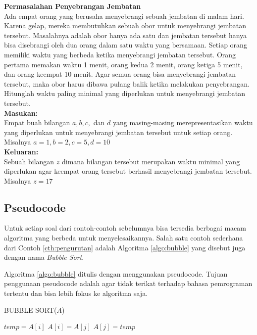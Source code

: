 \begin{contoh}
\textbf{Permasalahan Penyebrangan Jembatan}\\
Ada empat orang yang berusaha menyebrangi sebuah jembatan di malam hari. Karena gelap, mereka membutuhkan sebuah obor untuk menyebrangi jembatan tersebut. Masalahnya adalah obor hanya ada satu dan jembatan tersebut hanya bisa disebrangi oleh dua orang dalam satu waktu yang bersamaan. Setiap orang memiliki waktu yang berbeda ketika menyebrangi jembatan tersebut. Orang pertama memakan waktu 1 menit, orang kedua 2 menit, orang ketiga 5 menit, dan orang keempat 10 menit. 
Agar semua orang bisa menyebrangi jembatan tersebut, maka obor harus dibawa pulang balik ketika melakukan penyebrangan. Hitunglah waktu paling minimal yang diperlukan untuk menyebrangi jembatan tersebut.\\
\textbf{Masukan:}\\
Empat buah bilangan $a,b,c,$ dan $d$ yang masing-masing merepresentasikan waktu yang diperlukan untuk menyebrangi jembatan tersebut untuk setiap orang.\\
Misalnya $a = 1, b = 2, c = 5, d = 10$\\
\textbf{Keluaran:}\\
Sebuah bilangan $z$ dimana bilangan tersebut merupakan waktu minimal yang diperlukan agar keempat orang tersebut berhasil menyebrangi jembatan tersebut.\\
Misalnya $z = 17$\\
\end{contoh}

\subsection{Pseudocode}
Untuk setiap soal dari contoh-contoh sebelumnya bisa tersedia berbagai macam algoritma yang berbeda untuk menyelesaikannya. Salah satu contoh sederhana dari Contoh \ref{cth:pengurutan} adalah Algoritma \ref{algo:bubble} yang disebut juga dengan nama \textit{Bubble Sort}. 

Algoritma \ref{algo:bubble} ditulis dengan menggunakan pseudocode. Tujuan penggunaan pseudocode adalah agar tidak terikat terhadap bahasa pemrograman tertentu dan bisa lebih fokus ke algoritma saja.

\begin{algorithm}
	\caption{BUBBLE-SORT($A$)}
	\label{algo:bubble}
	\begin{algorithmic}[1]
			\STATE $temp = A[i]$
			\STATE $A[i] = A[j]$
			\STATE $A[j] = temp$
			\ENDIF
		\ENDFOR
	\ENDFOR
	\end{algorithmic}
\end{algorithm}

